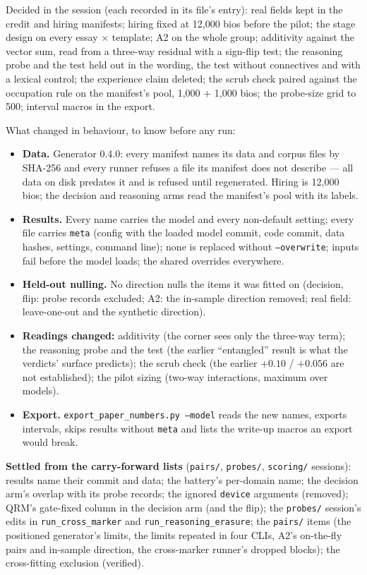 \documentclass{article}
\begin{document}
Decided in the session (each recorded in its file's entry): real fields kept in the credit and hiring manifests; hiring
fixed at 12{,}000 bios before the pilot; the stage design on every essay $\times$ template; A2 on the whole group;
additivity against the vector sum, read from a three-way residual with a sign-flip test; the reasoning probe and the
\leace{} test held out in the wording, the \leace{} test without connectives and with a lexical control; the experience
claim deleted; the scrub check paired against the occupation rule on the manifest's pool, 1{,}000 $+$ 1{,}000 bios;
the probe-size grid to 500; interval macros in the export.

What changed in behaviour, to know before any run:
\begin{itemize}
  \item \textbf{Data.} Generator 0.4.0: every manifest names its data and corpus files by SHA-256 and every runner
        refuses a file its manifest does not describe --- all data on disk predates it and is refused until
        regenerated. Hiring is 12{,}000 bios; the decision and reasoning arms read the manifest's pool with its
        labels.
  \item \textbf{Results.} Every name carries the model and every non-default setting; every file carries
        \texttt{meta} (config with the loaded model commit, code commit, data hashes, settings, command line); none is
        replaced without \texttt{--overwrite}; inputs fail before the model loads; the shared overrides everywhere.
  \item \textbf{Held-out nulling.} No direction nulls the items it was fitted on (decision, flip: probe records
        excluded; A2: the in-sample direction removed; real field: leave-one-out and the synthetic direction).
  \item \textbf{Readings changed:} additivity (the corner sees only the three-way term); the reasoning probe and the
        \leace{} test (the earlier ``entangled'' result is what the verdicts' surface predicts); the scrub check (the
        earlier $+0.10$ / $+0.056$ are not established); the pilot sizing (two-way interactions, maximum over models).
  \item \textbf{Export.} \texttt{export\_paper\_numbers.py --model} reads the new names, exports intervals, skips
        results without \texttt{meta} and lists the write-up macros an export would break.
\end{itemize}
\textbf{Settled from the carry-forward lists} (\texttt{pairs/}, \texttt{probes/}, \texttt{scoring/} sessions): results
name their commit and data; the battery's per-domain name; the decision arm's overlap with its probe records; the
ignored \texttt{device} arguments (removed); QRM's gate-fixed column in the decision arm (and the flip); the
\texttt{probes/} session's edits in \texttt{run\_cross\_marker} and \texttt{run\_reasoning\_erasure}; the
\texttt{pairs/} items (the positioned generator's limits, the limits repeated in four CLIs, A2's on-the-fly pairs and
in-sample direction, the cross-marker runner's dropped blocks); the cross-fitting exclusion (verified).
\end{document}
